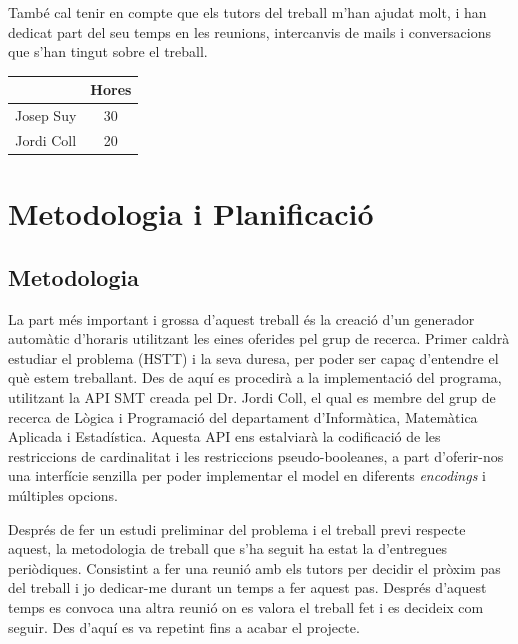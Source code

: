 \documentclass[11pt,a4paper,twoside]{report}
\begin{document}
   També cal tenir en compte que els tutors del treball m'han ajudat molt, i han dedicat part del seu temps en les reunions, intercanvis de mails i conversacions que s'han tingut sobre el treball.
   \begin{center}
    \begin{tabular}{|| c | c ||} 
    \hline
     & Hores \\ [0.5ex] 
    \hline\hline
    Josep Suy & 30 \\ [1ex] 
    Jordi Coll & 20 \\ [1ex] 
    \hline
   \end{tabular}
   \end{center}

  \chapter{Metodologia i Planificació}
  \section{Metodologia}
  La part més important i grossa d'aquest treball és la creació d'un generador automàtic d'horaris utilitzant les eines oferides pel grup de recerca. 
  Primer caldrà estudiar el problema (HSTT) i la seva duresa, per poder ser capaç d'entendre el què estem treballant.
  Des de aquí es procedirà a la implementació del programa, utilitzant la API SMT creada pel Dr. Jordi Coll, el qual es membre del grup de recerca de Lògica i Programació del departament d'Informàtica, Matemàtica Aplicada i Estadística.
  Aquesta API ens estalviarà la codificació de les restriccions de cardinalitat i les restriccions pseudo-booleanes, 
  a part d'oferir-nos una interfície senzilla per poder implementar el model en diferents \textit{encodings} i múltiples opcions.

  Després de fer un estudi preliminar del problema i el treball previ respecte aquest, la metodologia de treball que s'ha seguit ha estat la d'entregues periòdiques. 
  Consistint a fer una reunió amb els tutors per decidir el pròxim pas del treball i jo dedicar-me durant un temps a fer aquest pas. Després d'aquest temps es convoca una altra reunió on es valora el treball fet i es decideix com seguir. 
  Des d'aquí es va repetint fins a acabar el projecte.
\end{document}
